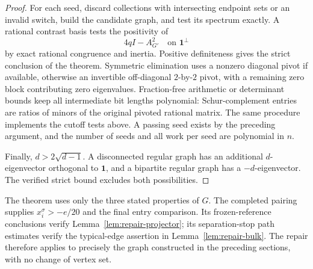 \begin{proof}
For each seed, discard collections with intersecting endpoint sets or an
invalid switch, build the candidate graph, and test its spectrum exactly.
A rational contrast basis tests the positivity
of
\[
 4qI-A_{G'}^2\quad\text{on }\mathbf 1^\perp
\]
by exact rational congruence and inertia.  Positive definiteness gives the
strict conclusion of the theorem.  Symmetric elimination uses a nonzero
diagonal pivot if available, otherwise an invertible off-diagonal
$2$-by-$2$ pivot, with a remaining zero block contributing zero eigenvalues.
Fraction-free arithmetic or determinant bounds keep all intermediate bit
lengths polynomial: Schur-complement entries are ratios of minors of the
original pivoted rational matrix.  The same procedure implements the cutoff
tests above.  A passing seed exists by the preceding argument, and the number
of seeds and all work per seed are polynomial in $n$.

Finally, $d>2\sqrt{d-1}$.  A disconnected regular graph has an additional
$d$-eigenvector orthogonal to $\mathbf 1$, and a bipartite regular graph has a
$-d$-eigenvector.  The verified strict bound excludes both possibilities.
\end{proof}

\begin{remark}
The theorem uses only the three stated properties of $G$.
The completed pairing supplies $x_i^\sigma>-e/20$ and the final entry
comparison.  Its frozen-reference conclusions verify
Lemma~\ref{lem:repair-projector}; its separation-stop path estimates verify
the typical-edge assertion in Lemma~\ref{lem:repair-bulk}.  The repair therefore
applies to precisely the graph constructed in the preceding sections, with
no change of vertex set.
\end{remark}
